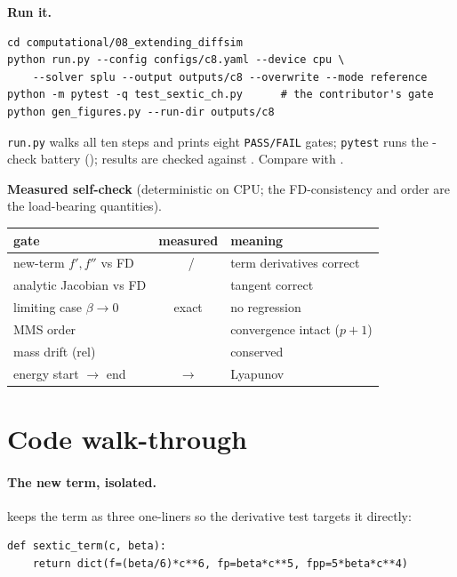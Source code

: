 \begin{runbox}
\textbf{Run it.}
\begin{lstlisting}
cd computational/08_extending_diffsim
python run.py --config configs/c8.yaml --device cpu \
    --solver splu --output outputs/c8 --overwrite --mode reference
python -m pytest -q test_sextic_ch.py      # the contributor's gate
python gen_figures.py --run-dir outputs/c8
\end{lstlisting}
\texttt{run.py} walks all ten steps and prints eight \texttt{PASS/FAIL} gates;
\texttt{pytest} runs the \CeightTests-check battery
(); results are checked against .
Compare with \file{EXPECTED.md}.
\end{runbox}

\begin{keybox}
\textbf{Measured self-check} (deterministic on CPU; the FD-consistency and
order are the load-bearing quantities).
\begin{center}\small
\begin{tabular}{lcl}
\toprule
gate & measured & meaning \\
\midrule
new-term $f',f''$ vs FD & \CeightTermFp\ / \CeightTermFpp & term derivatives correct \\
analytic Jacobian vs FD & \CeightJacFd & tangent correct \\
limiting case $\beta{\to}0$ & exact & no regression \\
MMS order & \CeightMmsOrder & convergence intact ($p{+}1$) \\
mass drift (rel) & \CeightMassDrift & conserved \\
energy start $\to$ end & \CeightEnergyStart$\to$\CeightEnergyEnd & Lyapunov \\
\bottomrule
\end{tabular}
\end{center}
\end{keybox}

\section{Code walk-through}

\paragraph{The new term, isolated.}  keeps the term as three
one-liners so the derivative test targets it directly:
\begin{lstlisting}
def sextic_term(c, beta):
    return dict(f=(beta/6)*c**6, fp=beta*c**5, fpp=5*beta*c**4)
\end{lstlisting}

